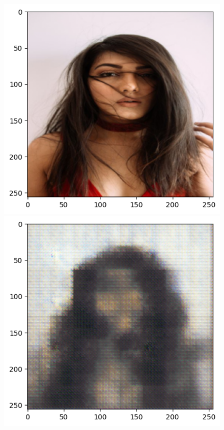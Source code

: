 \documentclass{article} %
\begin{document}
\begin{figure}[h]
    \label{reconstructions}
    \begin{center}
        \includegraphics[scale=0.45]{figs/real_face_orig.png}
        \includegraphics[scale=0.45]{figs/real_face_recon.png}

\end{center}
\end{figure}
\end{document}
